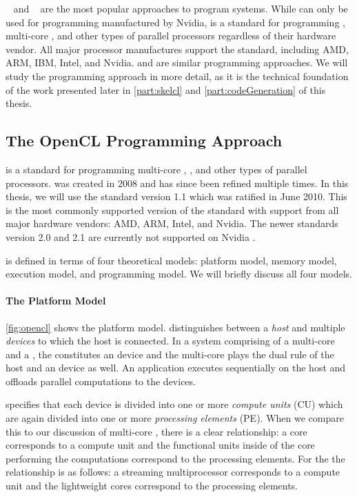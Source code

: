 \CUDA~\cite{CUDAProgrammingGuide} and \OpenCL~\cite{OpenCL} are the most popular approaches to program \GPU systems.
While \CUDA can only be used for programming \GPUs manufactured by Nvidia, \OpenCL is a standard for programming \GPUs, multi-core \CPUs, and other types of parallel processors regardless of their hardware vendor.
All major processor manufactures support the \OpenCL standard, including AMD, ARM, IBM, Intel, and Nvidia.
\CUDA and \OpenCL are similar programming approaches.
We will study the \OpenCL programming approach in more detail, as it is the technical foundation of the work presented later in \autoref{part:skelcl} and \autoref{part:codeGeneration} of this thesis.


\subsection{The OpenCL Programming Approach}
\OpenCL is a standard for programming multi-core \CPUs, \GPUs, and other types of parallel processors.
\OpenCL was created in 2008 and has since been refined multiple times.
In this thesis, we will use the \OpenCL standard version 1.1 which was ratified in June 2010.
This is the most commonly supported version of the standard with support from all major hardware vendors: AMD, ARM, Intel, and Nvidia.
The newer \OpenCL standards version 2.0 and 2.1 are currently not supported on Nvidia \GPUs.

\OpenCL is defined in terms of four theoretical models: platform model, memory model, execution model, and programming model.
We will briefly discuss all four models.

\paragraph{The \OpenCL Platform Model}
\autoref{fig:opencl} shows the \OpenCL platform model.
\OpenCL distinguishes between a \emph{host} and multiple \OpenCL \emph{devices} to which the host is connected.
In a system comprising of a multi-core \CPU and a \GPU, the \GPU constitutes an \OpenCL device and the multi-core \CPU plays the dual rule of the host and an \OpenCL device as well.
An \OpenCL application executes sequentially on the host and offloads parallel computations to the \OpenCL devices.

\OpenCL specifies that each device is divided into one or more \emph{compute units} (CU) which are again divided into one or more \emph{processing elements} (PE).
When we compare this to our discussion of multi-core \CPUs, there is a clear relationship:
a \CPU core corresponds to a compute unit and the functional units inside of the \CPU core performing the computations correspond to the processing elements.
For the \GPU the relationship is as follows:
a streaming multiprocessor corresponds to a compute unit and the lightweight \GPU cores correspond to the processing elements.


